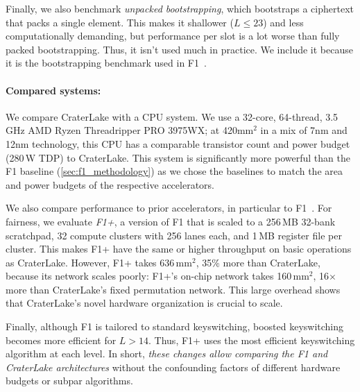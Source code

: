 Finally, we also benchmark \emph{unpacked bootstrapping}, which bootstraps a
ciphertext that packs a single element. This makes it shallower ($L{\leq}23$)
and less computationally demanding, but performance per slot is a lot worse
than fully packed bootstrapping. Thus, it isn't used much in practice. We
include it because it is the bootstrapping benchmark used in
F1~\cite{feldmann:micro21:f1}.

\paragraph{Compared systems:}
We compare CraterLake with a CPU system. We use a 32-core, 64-thread, 3.5\,GHz
AMD Ryzen Threadripper PRO 3975WX; at 420mm$^2$ in a mix of 7nm and 12nm
technology, this CPU has a comparable transistor count and power budget (280\,W
TDP) to CraterLake. This system is significantly more powerful than the F1
baseline (\autoref{sec:f1_methodology}) as we chose the baselines to match the
area and power budgets of the respective accelerators.

We also compare performance to prior accelerators, in particular to
F1~\cite{feldmann:micro21:f1}. For fairness, we evaluate \emph{F1+}, a version
of F1 that is scaled to a 256\,MB 32-bank scratchpad, 32 compute clusters with
256 lanes each, and 1\,MB register file per cluster. This makes F1+ have the
same or higher throughput on basic operations as CraterLake. However, F1+ takes
636\,mm$^2$, 35\% more than CraterLake, because its network scales poorly:
F1+'s on-chip network takes 160\,mm$^2$, 16$\times$ more than CraterLake's
fixed permutation network. This large overhead shows that CraterLake's novel
hardware organization is crucial to scale.

Finally, although F1 is tailored to standard keyswitching, boosted keyswitching
becomes more efficient for $L>14$. Thus, F1+ uses the most efficient
keyswitching algorithm at each level. In short, \emph{these changes allow
comparing the F1 and CraterLake architectures} without the confounding factors of
different hardware budgets or subpar algorithms.

